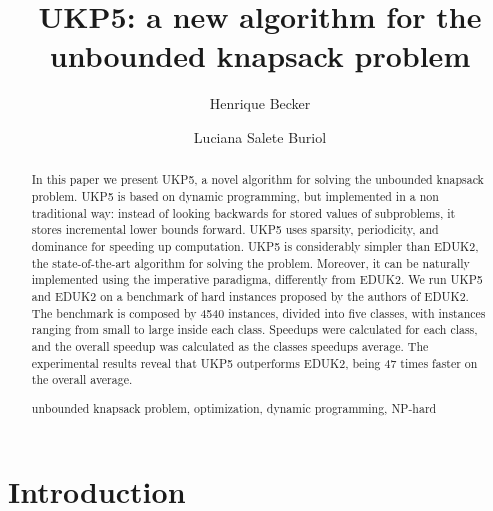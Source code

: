 \documentclass[runningheads,a4paper]{llncs}
\newcommand{\keywords}[1]{\par\addvspace\baselineskip
\noindent\keywordname\enspace\ignorespaces#1}
\begin{document}
\mainmatter  %

\title{UKP5: a new algorithm for the unbounded knapsack problem}


\author{Henrique Becker \and Luciana Salete Buriol}


\maketitle

\begin{abstract}
In this paper we present UKP5, a novel algorithm for solving the unbounded knapsack problem. UKP5 is based on dynamic programming, but implemented in a non traditional way: instead of looking backwards for stored values of subproblems, it stores incremental lower bounds forward. UKP5 uses sparsity, periodicity, and dominance for speeding up computation. UKP5 is considerably simpler than EDUK2, the state-of-the-art algorithm for solving the problem. Moreover, it can be naturally implemented using the imperative paradigma, differently from EDUK2. We run UKP5 and EDUK2 on a benchmark of hard instances proposed by the authors of EDUK2. The benchmark is composed by 4540 instances, divided into five classes, with instances ranging from small to large inside each class. Speedups were calculated for each class, and the overall speedup was calculated as the classes speedups average. The experimental results reveal that UKP5 outperforms EDUK2, being 47 times faster on the overall average.
\keywords{unbounded knapsack problem, optimization, dynamic programming, NP-hard}
\end{abstract}

\section{Introduction}
\end{document}
